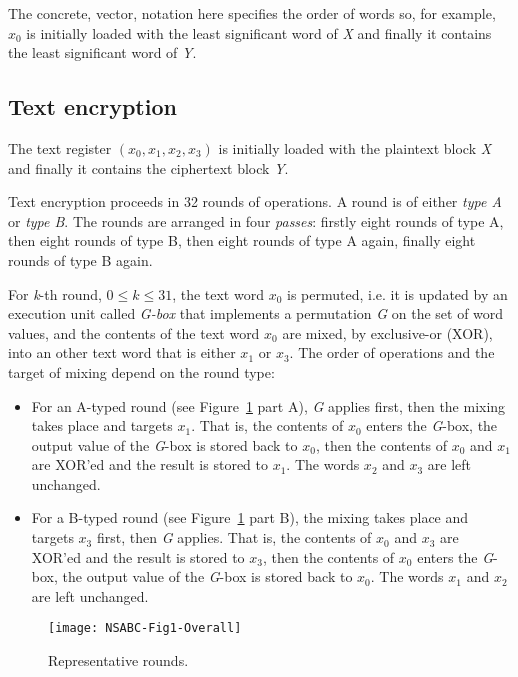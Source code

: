 \documentclass[a4paper,oneside,english]{amsart}
\numberwithin{equation}{section}
\numberwithin{figure}{section}
\begin{document}
The concrete, vector, notation here specifies the order of words so,
for example, $x_{0}$ is initially loaded with the least significant
word of \emph{X} and finally it contains the least significant word
of \emph{Y}.


\subsection{Text encryption }

The text register $(x_{0},x_{1},x_{2},x_{3})$ is initially loaded
with the plaintext block \emph{X} and finally it contains the ciphertext
block \emph{Y}.

Text encryption proceeds in 32 rounds of operations. A round is of
either \emph{type A} or \emph{type B}. The rounds are arranged in
four \emph{passes}: firstly eight rounds of type A, then eight rounds
of type B, then eight rounds of type A again, finally eight rounds
of type B again.

For \emph{k}-th round, $0\leq k\leq31$, the text word $x_{0}$ is
permuted, i.e. it is updated by an execution unit called \emph{G-box}
that implements a permutation \emph{G} on the set of word values,
and the contents of the text word $x_{0}$ are mixed, by exclusive-or
(XOR), into an other text word that is either $x_{1}$ or $x_{3}$.
The order of operations and the target of mixing depend on the round
type:
\begin{itemize}
\item For an A-typed round (see Figure~\ref{fig:Rounds} part A), \emph{G}
applies first, then the mixing takes place and targets $x_{1}$. That
is, the contents of $x_{0}$ enters the \emph{G}-box, the output value
of the \emph{G}-box is stored back to $x_{0}$, then the contents
of $x_{0}$ and $x_{1}$ are XOR'ed and the result is stored to $x_{1}$.
The words $x_{2}$ and $x_{3}$ are left unchanged.
\item For a B-typed round (see Figure~\ref{fig:Rounds} part B), the mixing
takes place and targets $x_{3}$ first, then \emph{G} applies. That
is, the contents of $x_{0}$ and $x_{3}$ are XOR'ed and the result
is stored to $x_{3}$, then the contents of $x_{0}$ enters the \emph{G}-box,
the output value of the \emph{G}-box is stored back to $x_{0}$. The
words $x_{1}$ and $x_{2}$ are left unchanged.
\end{itemize}
\begin{figure}
\texttt{[image: NSABC-Fig1-Overall]}

\caption{\label{fig:Rounds} Representative rounds.}
\end{figure}
\end{document}
